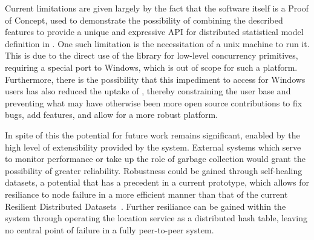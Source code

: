 \documentclass[letterpaper, inpress]{jds} %
\begin{document}
Current limitations are given largely by the fact that the software itself is a Proof of Concept, used to demonstrate the possibility of combining the described features to provide a unique and expressive API for distributed statistical model definition in .
One such limitation is the necessitation of a unix machine to run it.
This is due to the direct use of the  library for low-level concurrency primitives, requiring a special port to Windows, which is out of scope for such a platform.
Furthermore, there is the possibility that this impediment to access for Windows users has also reduced the uptake of , thereby constraining the user base and preventing what may have otherwise been more open source contributions to fix bugs, add features, and allow for a more robust platform.

In spite of this the potential for future work remains significant, enabled by the high level of extensibility provided by the system.
External systems which serve to monitor performance or take up the role of garbage collection would grant the possibility of greater reliability.
Robustness could be gained through self-healing datasets, a potential that has a precedent in a current prototype, which allows for resiliance to node failure in a more efficient manner than that of the current Resilient Distributed Datasets~\citep{zaharia2012resilient}.
Further resiliance can be gained within the system through operating the location service as a distributed hash table, leaving no central point of failure in a fully peer-to-peer system.



\end{document}
